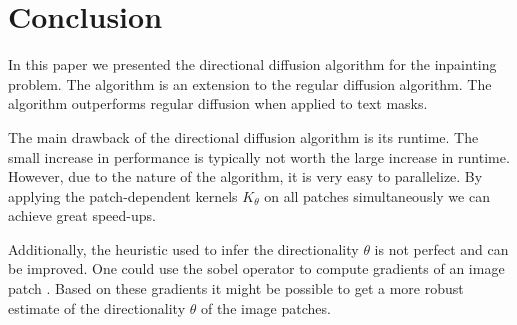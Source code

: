 \section{Conclusion}
\label{sec:conclusion}

In this paper we presented the directional diffusion algorithm for the inpainting problem. The algorithm is an extension to the regular diffusion algorithm. The algorithm outperforms regular diffusion when applied to text masks.

The main drawback of the directional diffusion algorithm is its runtime. The small increase in performance is typically not worth the large increase in runtime. However, due to the nature of the algorithm, it is very easy to parallelize. By applying the patch-dependent kernels $K_\theta$ on all patches simultaneously we can achieve great speed-ups.

Additionally, the heuristic used to infer the directionality $\theta$ is not perfect and can be improved. One could use the sobel operator to compute gradients of an image patch \cite{sobel2014history}. Based on these gradients it might be possible to get a more robust estimate of the directionality $\theta$ of the image patches. 

